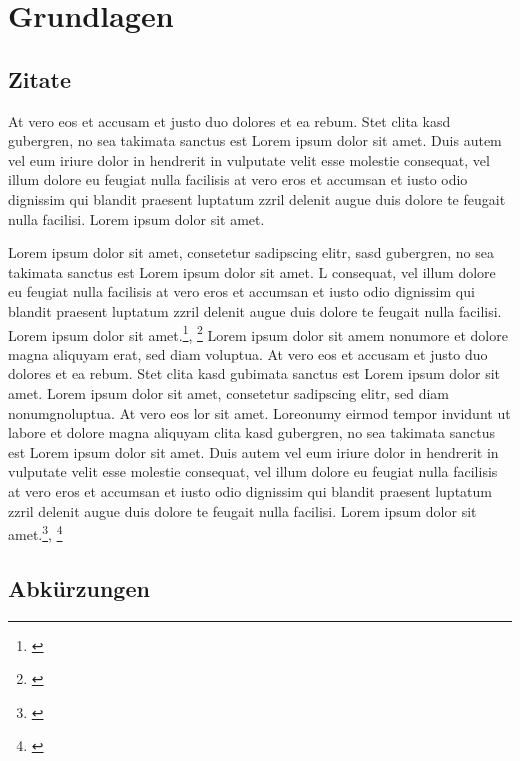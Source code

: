 \section{Grundlagen}

\subsection{Zitate}

At vero eos et accusam et justo duo dolores et ea rebum. Stet clita kasd gubergren, no sea takimata sanctus est Lorem ipsum dolor sit amet. Duis autem vel eum iriure dolor in hendrerit in vulputate velit esse molestie consequat, vel illum dolore eu feugiat nulla facilisis at vero eros et accumsan et iusto odio dignissim qui blandit praesent luptatum zzril delenit augue duis dolore te feugait nulla facilisi. Lorem ipsum dolor sit amet.

Lorem ipsum dolor sit amet, consetetur sadipscing elitr, sasd gubergren, no sea takimata sanctus est Lorem ipsum dolor sit amet. L consequat, vel illum dolore eu feugiat nulla facilisis at vero eros et accumsan et iusto odio dignissim qui blandit praesent luptatum zzril delenit augue duis dolore te feugait nulla facilisi. Lorem ipsum dolor sit amet.\footnote{\cite{maschek2013zugbeeinflussung}}, \footnote{\cite{wende2013fahrdynamik}} Lorem ipsum dolor sit amem nonumore et dolore magna aliquyam erat, sed diam voluptua. At vero eos et accusam et justo duo dolores et ea rebum. Stet clita kasd gubimata sanctus est Lorem ipsum dolor sit amet. Lorem ipsum dolor sit amet, consetetur sadipscing elitr, sed diam nonumgnoluptua. At vero eos lor sit amet. Loreonumy eirmod tempor invidunt ut labore et dolore magna aliquyam clita kasd gubergren, no sea takimata sanctus est Lorem ipsum dolor sit amet. Duis autem vel eum iriure dolor in hendrerit in vulputate velit esse molestie consequat, vel illum dolore eu feugiat nulla facilisis at vero eros et accumsan et iusto odio dignissim qui blandit praesent luptatum zzril delenit augue duis dolore te feugait nulla facilisi. Lorem ipsum dolor sit amet.\footnote{\cite{maschek2013zugbeeinflussung}}, \footnote{\cite{wende2013fahrdynamik}}

\subsection{Abkürzungen}

